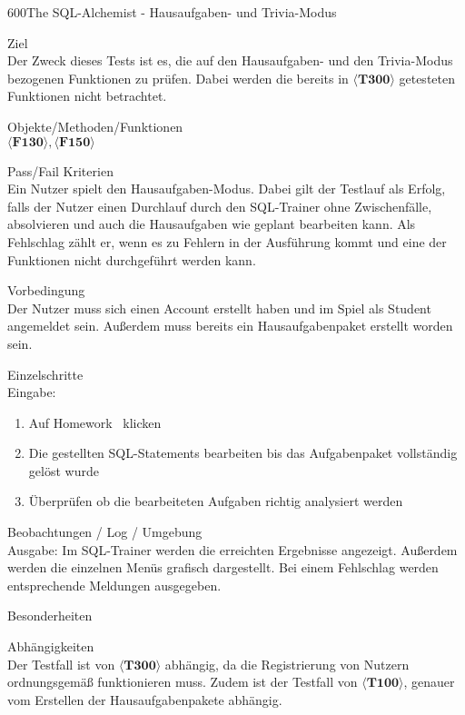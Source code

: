 \begin{testcase}{600}{The SQL-Alchemist - Hausaufgaben- und Trivia-Modus}

\item[Ziel]~\\
Der Zweck dieses Tests ist es, die auf den Hausaufgaben- und den Trivia-Modus bezogenen Funktionen zu prüfen. Dabei werden die bereits in $\langle\textbf{T300}\rangle$ getesteten Funktionen nicht betrachtet.

\item[Objekte/Methoden/Funktionen]~\\
$\langle\textbf{F130}\rangle, \langle\textbf{F150}\rangle$ 

\item[Pass/Fail Kriterien]~\\
Ein Nutzer spielt den Hausaufgaben-Modus. Dabei gilt der Testlauf als Erfolg, falls der Nutzer einen Durchlauf durch den SQL-Trainer  ohne Zwischenfälle, absolvieren und auch die Hausaufgaben wie geplant bearbeiten kann. Als Fehlschlag zählt er, wenn es zu Fehlern in der Ausführung kommt und eine der Funktionen nicht durchgeführt werden kann. 

\item[Vorbedingung]~\\
Der Nutzer muss sich einen Account erstellt haben und im Spiel als Student angemeldet sein. Außerdem muss bereits ein Hausaufgabenpaket erstellt worden sein.

\item[Einzelschritte]~\\

Eingabe:
\begin{enumerate}
\item Auf \glqq Homework \glqq~klicken
\item Die gestellten SQL-Statements bearbeiten bis das Aufgabenpaket vollständig gelöst wurde
\item Überprüfen ob die bearbeiteten Aufgaben richtig analysiert werden
\end{enumerate}

\item[Beobachtungen / Log / Umgebung]~\\
Ausgabe:
Im SQL-Trainer werden die erreichten Ergebnisse angezeigt. Außerdem werden die einzelnen Menüs grafisch dargestellt. Bei einem Fehlschlag werden entsprechende Meldungen ausgegeben.

\item[Besonderheiten]~\\

\item[Abhängigkeiten]~\\
Der Testfall ist von $\langle\textbf{T300}\rangle$ abhängig, da die Registrierung von Nutzern ordnungsgemäß funktionieren muss. Zudem ist der Testfall von $\langle\textbf{T100}\rangle$, genauer vom Erstellen der Hausaufgabenpakete abhängig. 

\end{testcase}


